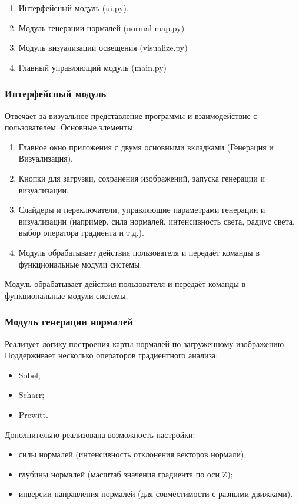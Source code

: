 \begin{enumerate}
	\item Интерфейсный модуль (ui.py).
	\item Модуль генерации нормалей (normal-map.py)
	\item Модуль визуализации освещения (visualize.py)
	\item Главный управляющий модуль (main.py)
\end{enumerate}
\subsubsection{Интерфейсный модуль}

Отвечает за визуальное представление программы и взаимодействие с пользователем. Основные элементы:
\begin{enumerate}
	\item Главное окно приложения с двумя основными вкладками (Генерация и Визуализация).
	\item Кнопки для загрузки, сохранения изображений, запуска генерации и визуализации.
	\item Слайдеры и переключатели, управляющие параметрами генерации и визуализации (например, сила нормалей, интенсивность света, радиус света, выбор оператора градиента и т.д.).
	\item Модуль обрабатывает действия пользователя и передаёт команды в функциональные модули системы.
\end{enumerate}

Модуль обрабатывает действия пользователя и передаёт команды в функциональные модули системы.
\subsubsection{Модуль генерации нормалей}

Реализует логику построения карты нормалей по загруженному изображению. Поддерживает несколько операторов градиентного анализа:
\begin{itemize}
	\item Sobel;
	\item Scharr;
	\item Prewitt.
\end{itemize}

Дополнительно реализована возможность настройки:
\begin{itemize}
	\item силы нормалей (интенсивность отклонения векторов нормали);
	\item глубины нормалей (масштаб значения градиента по оси Z);
	\item инверсии направления нормалей (для совместимости с разными движками).
\end{itemize}

